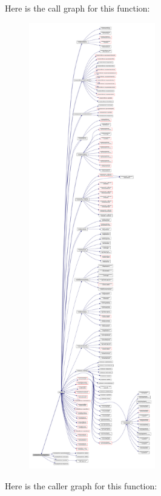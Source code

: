Here is the call graph for this function\+:\nopagebreak
\begin{figure}[H]
\begin{center}
\leavevmode
\includegraphics[height=550pt]{namespacemodulearpsformat_a996acecfde01fb49e6408da52cb50d12_cgraph}
\end{center}
\end{figure}
Here is the caller graph for this function\+:\nopagebreak
